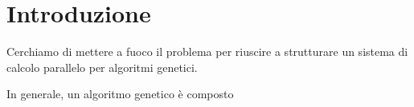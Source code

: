 \section{Introduzione}

Cerchiamo di mettere a fuoco il problema per riuscire a
strutturare un sistema di calcolo parallelo per algoritmi
genetici.

In generale, un algoritmo genetico è composto